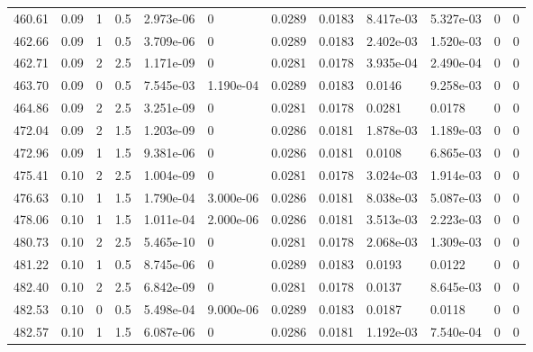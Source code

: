 \documentclass[preview]{standalone}
\begin{document}
{{{{{{{\begin{tabular}{L{1.2cm}C{1.2cm} C{0.3cm}C{0.5cm} C{1.4cm}C{1.4cm} C{1.4cm}C{1.4cm} C{1.6cm}C{1.6cm} C{1.6cm}C{1.6cm}}
  460.61  &  0.09  & 1     & 0.5 &  2.973e-06  & 0  &  0.0289&   0.0183& 8.417e-03 & 5.327e-03   &  0 & 0  \\ 
  462.66  &  0.09  & 1     & 0.5 &  3.709e-06  & 0  &  0.0289&   0.0183& 2.402e-03 & 1.520e-03   &  0 & 0  \\ 
  462.71  &  0.09  & 2     & 2.5 &  1.171e-09  & 0  &  0.0281&   0.0178& 3.935e-04 & 2.490e-04   &  0 & 0  \\ 
  463.70  &  0.09  & 0     & 0.5 &  7.545e-03  & 1.190e-04  &  0.0289&   0.0183& 0.0146 & 9.258e-03   &  0 & 0  \\ 
  464.86  &  0.09  & 2     & 2.5 &  3.251e-09  & 0  &  0.0281&   0.0178& 0.0281 & 0.0178   &  0 & 0  \\ 
  472.04  &  0.09  & 2     & 1.5 &  1.203e-09  & 0  &  0.0286&   0.0181& 1.878e-03 & 1.189e-03   &  0 & 0  \\ 
  472.96  &  0.09  & 1     & 1.5 &  9.381e-06  & 0  &  0.0286&   0.0181& 0.0108 & 6.865e-03   &  0 & 0  \\ 
  475.41  &  0.10  & 2     & 2.5 &  1.004e-09  & 0  &  0.0281&   0.0178& 3.024e-03 & 1.914e-03   &  0 & 0  \\ 
  476.63  &  0.10  & 1     & 1.5 &  1.790e-04  & 3.000e-06  &  0.0286&   0.0181& 8.038e-03 & 5.087e-03   &  0 & 0  \\ 
  478.06  &  0.10  & 1     & 1.5 &  1.011e-04  & 2.000e-06  &  0.0286&   0.0181& 3.513e-03 & 2.223e-03   &  0 & 0  \\ 
  480.73  &  0.10  & 2     & 2.5 &  5.465e-10  & 0  &  0.0281&   0.0178& 2.068e-03 & 1.309e-03   &  0 & 0  \\ 
  481.22  &  0.10  & 1     & 0.5 &  8.745e-06  & 0  &  0.0289&   0.0183& 0.0193 & 0.0122   &  0 & 0  \\ 
  482.40  &  0.10  & 2     & 2.5 &  6.842e-09  & 0  &  0.0281&   0.0178& 0.0137 & 8.645e-03   &  0 & 0  \\ 
  482.53  &  0.10  & 0     & 0.5 &  5.498e-04  & 9.000e-06  &  0.0289&   0.0183& 0.0187 & 0.0118   &  0 & 0  \\ 
  482.57  &  0.10  & 1     & 1.5 &  6.087e-06  & 0  &  0.0286&   0.0181& 1.192e-03 & 7.540e-04   &  0 & 0  \\ 
\hline 
\end{tabular} 

}}}}}}}
\end{document}
